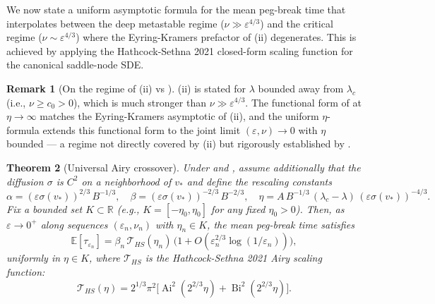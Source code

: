 \documentclass[11pt,a4paper]{article}
\theoremstyle{plain}
\newtheorem{theorem}{Theorem}[section]
\theoremstyle{definition}
\newtheorem{remark}[theorem]{Remark}
\newcommand{\R}{\mathbb{R}}
\newcommand{\E}{\mathbb{E}}
\newcommand{\eps}{\varepsilon}
\newcommand{\Ai}{\operatorname{Ai}}
\newcommand{\Bi}{\operatorname{Bi}}
\begin{document}
We now state a uniform asymptotic formula for the mean peg-break time that interpolates between the deep metastable regime ($\nu \gg \eps^{4/3}$) and the critical regime ($\nu \sim \eps^{4/3}$) where the Eyring-Kramers prefactor of (ii) degenerates.
This is achieved by applying the Hathcock-Sethna 2021 \cite{HathcockSethna2021} closed-form scaling function for the canonical saddle-node SDE.

\begin{remark}[On the regime of (ii) vs ]
(ii) is stated for $\lambda$ bounded away from $\lambda_c$ (i.e., $\nu \geq c_0 > 0$), which is much stronger than $\nu \gg \eps^{4/3}$.
The functional form of  at $\eta \to \infty$ matches the Eyring-Kramers asymptotic of (ii), and the uniform $\eta$-formula extends this functional form to the joint limit $(\eps,\nu) \to 0$ with $\eta$ bounded --- a regime not directly covered by (ii) but rigorously established by .
\end{remark}

\begin{theorem}[Universal Airy crossover]\label{thm:airy}
Under  and , assume additionally that the diffusion $\sigma$ is $C^2$ on a neighborhood of $v_*$ and define the rescaling constants
\begin{equation}
\alpha = (\eps\sigma(v_*))^{2/3}\,B^{-1/3},\quad \beta = (\eps\sigma(v_*))^{-2/3}\,B^{-2/3},\quad \eta = A\,B^{-1/3}\,(\lambda_c - \lambda)\,(\eps\sigma(v_*))^{-4/3}.
\label{eq:airy-rescaling}
\end{equation}
Fix a bounded set $K \subset \R$ (e.g., $K = [-\eta_0, \eta_0]$ for any fixed $\eta_0 > 0$). Then, as $\eps \to 0^+$ along sequences $(\eps_n, \nu_n)$ with $\eta_n \in K$, the mean peg-break time satisfies
\begin{equation}
\E[\tau_{\eps_n}] = \beta_n\,\mathcal T_{HS}(\eta_n)\,\big(1 + O(\eps_n^{2/3}\log(1/\eps_n))\big),
\label{eq:airy-joint}
\end{equation}
uniformly in $\eta \in K$, where $\mathcal T_{HS}$ is the Hathcock-Sethna 2021 \cite[Eq.~15]{HathcockSethna2021} Airy scaling function:
\begin{equation}
\boxed{\mathcal T_{HS}(\eta) = 2^{1/3}\pi^2\Big[\Ai^2(2^{2/3}\eta) + \Bi^2(2^{2/3}\eta)\Big].}
\end{equation}
\end{theorem}
\end{document}
